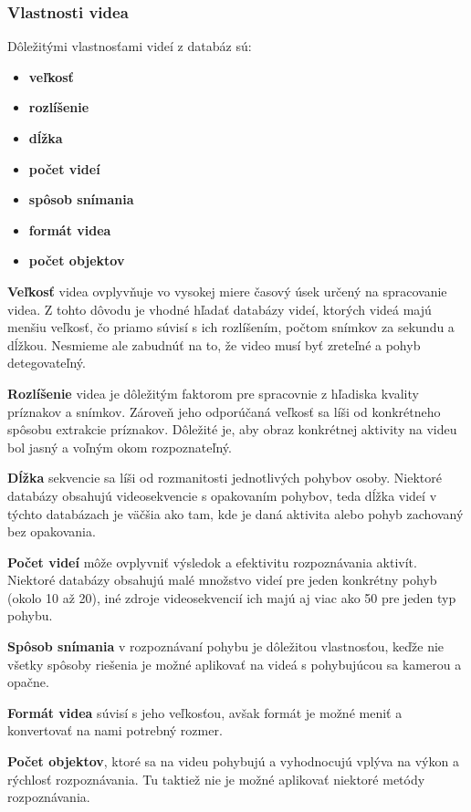 \subsubsection{Vlastnosti videa} Dôležitými vlastnosťami videí z databáz sú:
\begin{itemize}
\item \textbf{veľkosť}
\item \textbf{rozlíšenie}
\item \textbf{dĺžka}
\item \textbf{počet videí}
\item \textbf{spôsob snímania}
\item \textbf{formát videa}
\item \textbf{počet objektov}
\end{itemize}

\textbf{Veľkosť} videa ovplyvňuje vo vysokej miere časový úsek určený na spracovanie videa. Z tohto dôvodu je vhodné hľadať databázy videí, ktorých videá majú menšiu veľkosť, čo priamo súvisí s ich rozlíšením, počtom snímkov za sekundu a dĺžkou. Nesmieme ale zabudnúť na to, že video musí byť zreteľné a pohyb detegovateľný.

\textbf{Rozlíšenie} videa je dôležitým faktorom pre spracovnie z hľadiska kvality príznakov a snímkov. Zároveň jeho odporúčaná veľkosť sa líši od konkrétneho spôsobu extrakcie príznakov. Dôležité je, aby obraz konkrétnej aktivity na videu bol jasný a voľným okom rozpoznateľný.

\textbf{Dĺžka} sekvencie sa líši od rozmanitosti jednotlivých pohybov osoby. Niektoré databázy obsahujú videosekvencie s opakovaním pohybov, teda dĺžka videí v týchto databázach je väčšia ako tam, kde je daná aktivita alebo pohyb zachovaný bez opakovania.

\textbf{Počet videí} môže ovplyvniť výsledok a efektivitu rozpoznávania aktivít. Niektoré databázy obsahujú malé množstvo videí pre jeden konkrétny pohyb (okolo 10 až 20), iné zdroje videosekvencií ich majú aj viac ako 50 pre jeden typ pohybu.

\textbf{Spôsob snímania} v rozpoznávaní pohybu je dôležitou vlastnosťou, keďže nie všetky spôsoby riešenia je možné aplikovať na videá s pohybujúcou sa kamerou a opačne. 

\textbf{Formát videa} súvisí s jeho veľkosťou, avšak formát je možné meniť a konvertovať na nami potrebný rozmer.

\textbf{Počet objektov}, ktoré sa na videu pohybujú a vyhodnocujú vplýva na výkon a rýchlosť rozpoznávania. Tu taktiež nie je možné aplikovať niektoré metódy rozpoznávania.

